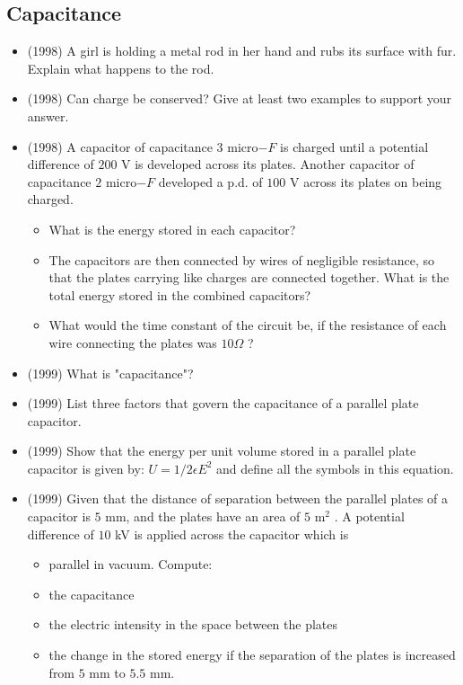\documentclass{article}
\begin{document}
\subsection{Capacitance}
\begin{itemize}
\item (1998)  A girl is holding a metal rod in her hand and rubs its surface with fur. Explain what happens to the rod.
\item (1998)  Can charge be conserved? Give at least two examples to support your answer.
\item (1998)  A capacitor of capacitance $ 3$ micro$ -F$ is charged until a potential difference of $ 200$ V is developed across its plates. Another capacitor of capacitance $ 2$ micro$ -F$ developed a p.d. of $ 100$ V across its plates on being charged.
 \begin{itemize}
\item What is the energy stored in each capacitor?
\item The capacitors are then connected by wires of negligible resistance, so that the plates carrying like charges are connected together. What is the total energy stored in the combined capacitors?
\item What would the time constant of the circuit be, if the resistance of each wire connecting the plates was $ 10\Omega $ ?
\end{itemize}
\item (1999)  What is "capacitance"?
\item (1999)  List three factors that govern the capacitance of a parallel plate capacitor.
\item (1999)  Show that the energy per unit volume stored in a parallel plate capacitor is given by: $ U=1/2\epsilon E^{2}$ and define all the symbols in this equation.
\item (1999)  Given that the distance of separation between the parallel plates of a capacitor is $ 5$ mm, and the plates have an area of $ 5$ m$ ^{2}$ . A potential difference of $ 10$ kV is applied across the capacitor which is
 \begin{itemize}
\item parallel in vacuum. Compute:
\item the capacitance
\item the electric intensity in the space between the plates
\item the change in the stored energy if the separation of the plates is increased from $ 5$ mm to $ 5.5$ mm.
\end{itemize}

\end{itemize}
\end{document}
